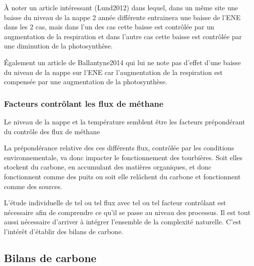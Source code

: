 À noter un article intéressant (Lund2012) dans lequel, dans un même site une baisse du niveau de la nappe 2 année différente entrainera une baisse de l'ENE dans les 2 cas, mais dans l'un des cas cette baisse est contrôlée par un augmentation de la respiration et dans l'autre cas cette baisse est contrôlée par une diminution de la photosynthèse.

Également un article de Ballantyne2014 qui lui ne note pas d'effet d'une baisse du niveau de la nappe sur l'ENE car l'augmentation de la respiration est compensée par une augmentation de la photosynthèse.

\subsubsection{Facteurs contrôlant les flux de méthane}

Le niveau de la nappe et la température semblent être les facteurs prépondérant du contrôle des flux de méthane



La prépondérance relative des ces différents flux, contrôlée par les conditions environnementale, va donc impacter le fonctionnement des tourbières. 
Soit elles stockent du carbone, en accumulant des matières organiques, et donc fonctionnent comme des puits ou soit elle relâchent du carbone et fonctionnent comme des sources.


L'étude individuelle de tel ou tel flux avec tel ou tel facteur contrôlant est nécessaire afin de comprendre ce qu'il se passe au niveau des processus.
Il est tout aussi nécessaire d'arriver à intégrer l'ensemble de la complexité naturelle.
C'est l'intérêt d'établir des bilans de carbone.

\subsection{Bilans de carbone}

